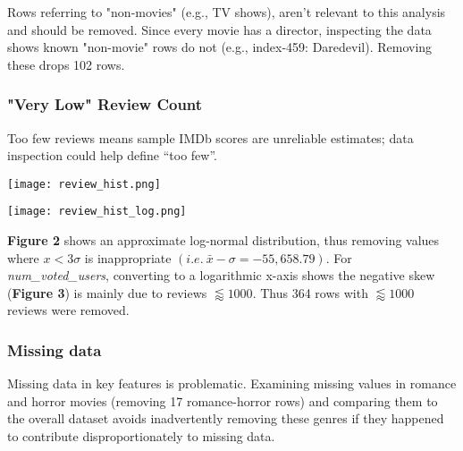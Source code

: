 \documentclass[11pt]{article}
\begin{document}
Rows referring to "non-movies" (e.g., TV shows), aren’t relevant to this analysis and should be removed. Since every movie has a director, inspecting the data shows known "non-movie" rows do not (e.g., index-459: Daredevil). Removing these drops 102 rows.

\subsubsection{"Very Low" Review Count}

Too few reviews means sample IMDb scores are unreliable estimates; data inspection could help define “too few”.

\begin{center}
    \texttt{[image: review\_hist.png]}
\end{center}

\pagebreak
\begin{center}
    \texttt{[image: review\_hist\_log.png]}
\end{center}

\textbf{Figure 2} shows an approximate log-normal distribution, thus removing values where $x < 3\sigma$ is inappropriate $(i.e.~\bar{x}-\sigma = -55,658.79)$. For \emph{num\_voted\_users}, converting to a logarithmic x-axis shows the negative skew (\textbf{Figure 3}) is mainly due to reviews $\lessapprox 1000$. Thus 364 rows with $\lessapprox 1000$ reviews were removed.

\subsubsection{Missing data}

Missing data in key features is problematic. Examining missing values in romance and horror movies (removing 17 romance-horror rows) and comparing them to the overall dataset avoids inadvertently removing these genres if they happened to contribute disproportionately to missing data.
\end{document}
